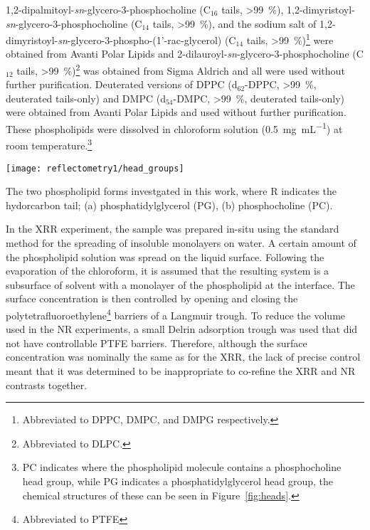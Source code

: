 1,2-dipalmitoyl-\emph{sn}-glycero-3-phosphocholine (C$_{16}$ tails, \SI{>99}{\percent}), 1,2-dimyristoyl-\emph{sn}-glycero-3-phosphocholine (C$_{14}$ tails, \SI{>99}{\percent}), and the sodium salt of 1,2-dimyristoyl-\emph{sn}-glycero-3-phospho-(1'-rac-glycerol) (C$_{14}$ tails, \SI{>99}{\percent})\footnote{Abbreviated to DPPC, DMPC, and DMPG respectively.} were obtained from Avanti Polar Lipids and 2-dilauroyl-\emph{sn}-glycero-3-phosphocholine (C$_{12}$ tails, \SI{>99}{\percent})\footnote{Abbreviated to DLPC.} was obtained from Sigma Aldrich and all were used without further purification.
Deuterated versions of DPPC (d$_{62}$-DPPC, \SI{>99}{\percent}, deuterated tails-only) and DMPC (d$_{54}$-DMPC, \SI{>99}{\percent}, deuterated tails-only) were obtained from Avanti Polar Lipids and used without further purification.
These phospholipids were dissolved in chloroform solution (\SI{0.5}{\milli\gram\per\milli\liter}) at room temperature.\footnote{PC indicates where the phospholipid molecule contains a phosphocholine head group, while PG indicates a phosphatidylglycerol head group, the chemical structures of these can be seen in Figure~\ref{fig:heads}.}
%
\begin{marginfigure}
    \centering
    \texttt{[image: reflectometry1/head\_groups]}
    \caption{The two phospholipid forms investgated in this work, where R indicates the hydorcarbon tail; (a) phosphatidylglycerol (PG), (b) phosphocholine (PC).}
    \label{fig:heads}
\end{marginfigure}
%

In the XRR experiment, the sample was prepared in-situ using the standard method for the spreading of insoluble monolayers on water.
A certain amount of the phospholipid solution was spread on the liquid surface.
Following the evaporation of the chloroform, it is assumed that the resulting system is a subsurface of solvent with a monolayer of the phospholipid at the interface.
The surface concentration is then controlled by opening and closing the polytetrafluoroethylene\footnote{Abbreviated to PTFE} barriers of a Langmuir trough.
To reduce the volume used in the NR experiments, a small Delrin adsorption trough was used that did not have controllable PTFE barriers.
Therefore, although the surface concentration was nominally the same as for the XRR, the lack of precise control meant that it was determined to be inappropriate to co-refine the XRR and NR contrasts together.

